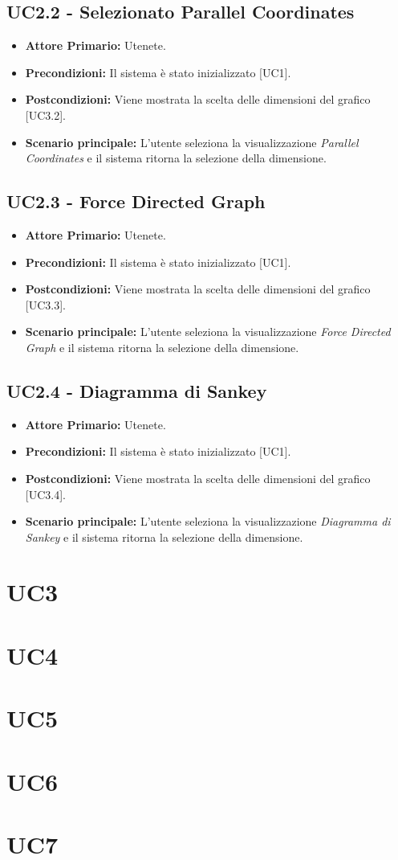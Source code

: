  \subsection{UC2.2 - Selezionato Parallel Coordinates}
 \begin{itemize}
    \item \textbf{Attore Primario:} Utenete.
    \item \textbf{Precondizioni:} Il sistema è stato inizializzato [UC1].
    \item \textbf{Postcondizioni:} Viene mostrata la scelta delle dimensioni del grafico [UC3.2].
    \item \textbf{Scenario principale:} L'utente seleziona la visualizzazione \textit{Parallel Coordinates} e il sistema ritorna la selezione della dimensione.
\end{itemize}
 \subsection{UC2.3 - Force Directed Graph}
 \begin{itemize}
    \item \textbf{Attore Primario:} Utenete.
    \item \textbf{Precondizioni:} Il sistema è stato inizializzato [UC1].
    \item \textbf{Postcondizioni:} Viene mostrata la scelta delle dimensioni del grafico [UC3.3].
    \item \textbf{Scenario principale:} L'utente seleziona la visualizzazione \textit{Force Directed Graph} e il sistema ritorna la selezione della dimensione.
\end{itemize}
 \subsection{UC2.4 - Diagramma di Sankey}
 \begin{itemize}
    \item \textbf{Attore Primario:} Utenete.
    \item \textbf{Precondizioni:} Il sistema è stato inizializzato [UC1].
    \item \textbf{Postcondizioni:} Viene mostrata la scelta delle dimensioni del grafico [UC3.4].
    \item \textbf{Scenario principale:} L'utente seleziona la visualizzazione \textit{Diagramma di Sankey} e il sistema ritorna la selezione della dimensione.
\end{itemize}

\section{UC3}

\section{UC4}

\section{UC5}

\section{UC6}

\section{UC7}